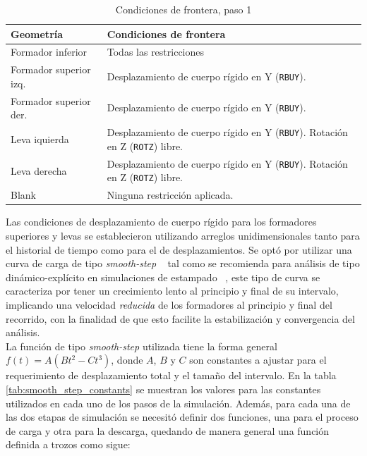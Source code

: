 \begin{table}[H]
\centering
\caption{Condiciones de frontera, paso 1}
\label{}
\begin{tabular}{p{4cm} p{8cm}} \hline
Geometría &  Condiciones de frontera \\
\hline
Formador inferior        & Todas las restricciones   \\
Formador superior izq.   & Desplazamiento de cuerpo rígido en Y (\texttt{RBUY}). \\
Formador superior der.   & Desplazamiento de cuerpo rígido en Y (\texttt{RBUY}). \\
Leva iquierda            & Desplazamiento de cuerpo rígido en Y (\texttt{RBUY}). Rotación en Z (\texttt{ROTZ}) libre. \\
Leva derecha             & Desplazamiento de cuerpo rígido en Y (\texttt{RBUY}). Rotación en Z (\texttt{ROTZ}) libre. \\
Blank                    & Ninguna restricción aplicada. \\
\hline
\end{tabular}
\label{tab:bound_conds_01}
\end{table}

Las condiciones de desplazamiento de cuerpo rígido para los formadores superiores y levas 
se establecieron utilizando arreglos unidimensionales tanto para el historial de tiempo 
como para el de desplazamientos. Se optó por utilizar una curva de carga de tipo 
\textit{smooth-step} ~\cite{smooth-step-wiki} tal como se recomienda para análisis 
de tipo dinámico-explícito en simulaciones de estampado ~\cite{input-param-lsdyna}, 
este tipo de curva se caracteriza por tener un crecimiento lento al principio y 
final de su intervalo,  implicando una velocidad \textit{reducida} de los formadores al principio y final 
del recorrido, con la finalidad de que esto facilite la estabilización y convergencia
del análisis. \\

La función de tipo \textit{smooth-step} utilizada tiene la forma general $f(t) = A(Bt^2 - Ct^3)$, 
donde $A$, $B$ y $C$ son constantes a ajustar para el requerimiento de desplazamiento total y el 
tamaño del intervalo. En la tabla \ref{tab:smooth_step_constants} se muestran los valores para 
las constantes utilizados en cada uno de los pasos de la simulación. Además, para cada 
una de las dos etapas de simulación se necesitó definir dos funciones, una para el proceso 
de carga y otra para la descarga, quedando de manera general una función definida a trozos como sigue:

